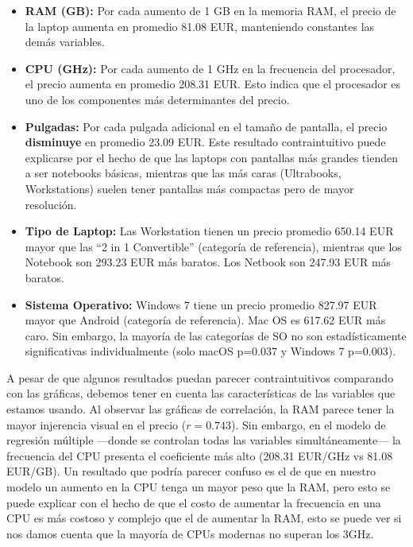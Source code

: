 \documentclass[12pt,a4paper]{article}
\begin{document}
\begin{itemize}
    \item \textbf{RAM (GB):} Por cada aumento de 1 GB en la memoria RAM, el precio de la laptop aumenta en promedio 81.08 EUR, manteniendo constantes las demás variables.
    
    \item \textbf{CPU (GHz):} Por cada aumento de 1 GHz en la frecuencia del procesador, el precio aumenta en promedio 208.31 EUR. Esto indica que el procesador es uno de los componentes más determinantes del precio.
    
    \item \textbf{Pulgadas:} Por cada pulgada adicional en el tamaño de pantalla, el precio \textbf{disminuye} en promedio 23.09 EUR. Este resultado contraintuitivo puede explicarse por el hecho de que las laptops con pantallas más grandes tienden a ser notebooks básicas, mientras que las más caras (Ultrabooks, Workstations) suelen tener pantallas más compactas pero de mayor resolución.
    
    \item \textbf{Tipo de Laptop:} Las Workstation tienen un precio promedio 650.14 EUR mayor que las ``2 in 1 Convertible'' (categoría de referencia), mientras que los Notebook son 293.23 EUR más baratos. Los Netbook son 247.93 EUR más baratos.
    
    \item \textbf{Sistema Operativo:} Windows 7 tiene un precio promedio 827.97 EUR mayor que Android (categoría de referencia). Mac OS es 617.62 EUR más caro. Sin embargo, la mayoría de las categorías de SO no son estadísticamente significativas individualmente (solo macOS p=0.037 y Windows 7 p=0.003).
\end{itemize}
    
    
    A pesar de que algunos resultados puedan parecer contraintuitivos comparando con las gráficas, debemos tener en cuenta las características de las variables que estamos usando. Al observar las gráficas de correlación, la RAM parece tener la mayor injerencia visual en el precio ($r = 0.743$). Sin embargo, en el modelo de regresión múltiple ---donde se controlan todas las variables simultáneamente--- la frecuencia del CPU presenta el coeficiente más alto (208.31 EUR/GHz vs 81.08 EUR/GB). Un resultado que podría parecer confuso es el de que en nuestro modelo un aumento en la CPU tenga un mayor peso que la RAM, pero esto se puede explicar con el hecho de que el costo de aumentar la frecuencia en una CPU es más costoso y complejo que el de aumentar la RAM, esto se puede ver si nos damos cuenta que la mayoría de CPUs modernas no superan los 3GHz. 
    
\end{document}
